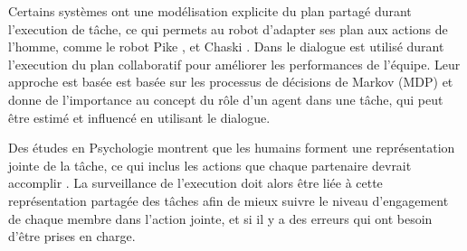 \documentclass[a4paper,11pt,twoside]{StyleThese}
\begin{document}


Certains systèmes ont une modélisation explicite du plan partagé durant l'execution de tâche, ce qui permets au robot d'adapter ses plan aux actions de l'homme, comme le robot Pike
\cite{levine2014concurrent,karpas2015robust}, et Chaski \cite{shah2011improved}.
Dans \cite{clairrobot} le dialogue est utilisé durant l'execution du plan collaboratif pour améliorer les performances de l'équipe. Leur approche est basée est basée sur les processus de décisions de Markov (MDP) et donne de l'importance au concept du rôle d'un agent dans une tâche, qui peut être estimé et influencé en utilisant le dialogue.

Des études en Psychologie montrent que les humains forment une représentation jointe de la tâche, ce qui inclus les actions que chaque partenaire devrait accomplir \cite{sebanz2006joint}. La surveillance de l'execution doit alors être liée à cette représentation partagée des tâches afin de mieux suivre le niveau d'engagement de chaque membre dans l'action jointe, et si il y a des erreurs qui ont besoin d'être prises en charge.






 
\end{document}
